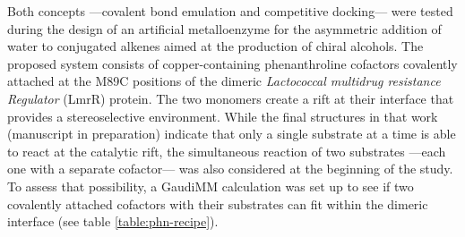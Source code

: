 Both concepts ---covalent bond emulation and competitive docking--- were tested during the design of an artificial metalloenzyme for the asymmetric addition of water to conjugated alkenes aimed at the production of chiral alcohols. The proposed system consists of copper-containing phenanthroline cofactors covalently attached at the M89C positions of the dimeric \textit{Lactococcal multidrug resistance Regulator} (LmrR) protein. The two monomers create a rift at their interface that provides a	 stereoselective environment.  While the final structures in that work (manuscript in preparation) indicate that only a single substrate at a time is able to react at the catalytic rift, the simultaneous reaction of two substrates ---each one with a separate cofactor--- was also considered at the beginning of the study. To assess that possibility, a GaudiMM calculation was set up to see if two covalently attached cofactors with their substrates can fit within the dimeric interface (see table \ref{table:phn-recipe}).

